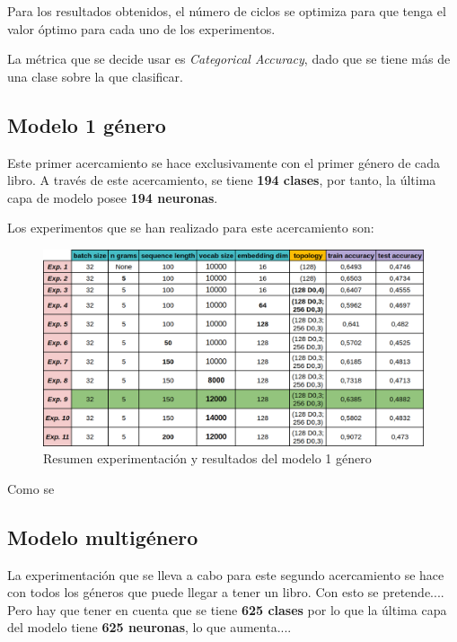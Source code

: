\documentclass[12pt,a4paper, xcolor=table]{article}
\begin{document}
Para los resultados obtenidos, el número de ciclos se optimiza para que tenga el valor óptimo para cada uno de los experimentos.

\vspace{2mm}

La métrica que se decide usar es \textit{Categorical Accuracy}, dado que se tiene más de una clase sobre la que clasificar.


\subsection{Modelo 1 género}

Este primer acercamiento se hace exclusivamente con el primer género de cada libro. A través de este acercamiento, se tiene \textbf{194 clases}, por tanto, la última capa de modelo posee \textbf{194 neuronas}.

\vspace{2mm}

Los experimentos que se han realizado para este acercamiento son:

\begin{figure}[!h]
    \centering
    \includegraphics[width=500px]{img/one.png}
    \caption{Resumen experimentación y resultados del modelo 1 género}
\end{figure}

Como se


\subsection{Modelo multigénero}

La experimentación que se lleva a cabo para este segundo acercamiento se hace con todos los géneros que puede llegar a tener un libro. Con esto se pretende.... Pero hay que tener en cuenta que se tiene \textbf{625 clases} por lo que la última capa del modelo tiene \textbf{625 neuronas}, lo que aumenta....
\end{document}

